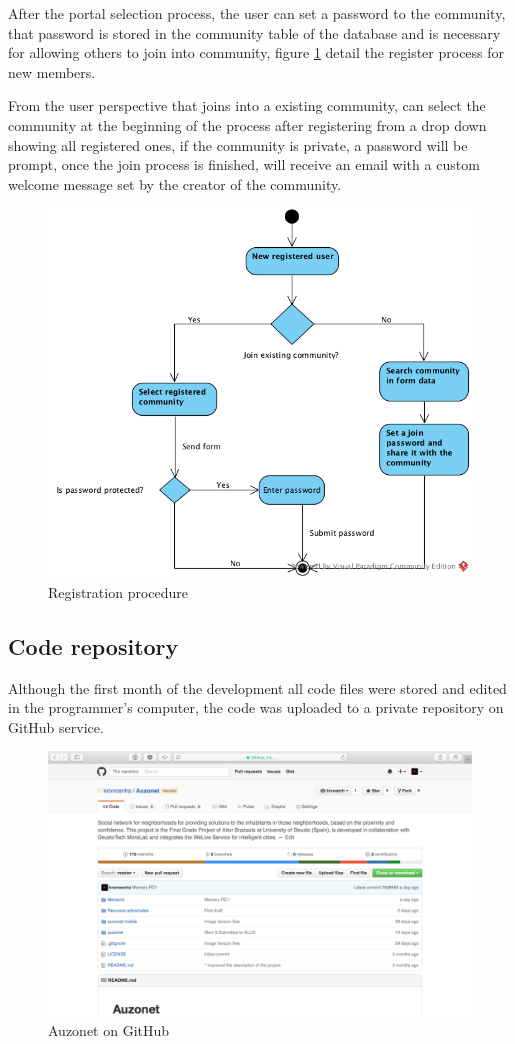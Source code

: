 \documentclass{DeustoFDP}
\begin{document}
After the portal selection process, the user can set a password to the community, that password is stored in the community table of the database and is necessary for allowing others to join into community, figure \ref{fig:Registerflow} detail the register process for new members.

From the user perspective that joins into a existing community, can select the community at the beginning of the process after registering from a drop down showing all registered ones, if the community is private, a password will be prompt, once the join process is finished, will receive an email with a custom welcome message set by the creator of the community.

\begin{figure}[h!]
\centering
\includegraphics[width=0.7\linewidth]{fig/Registerflow}
\caption[Registration procedure]{Registration procedure}
\label{fig:Registerflow}
\end{figure}

\newpage
\subsection{Code repository}
Although the first month of the development all code files were stored and edited in the programmer's computer, the code was uploaded to a private repository on GitHub service.

\begin{figure}[h!]
\centering
\includegraphics[width=0.7\linewidth]{fig/githubhome}
\caption[Auzonet on GitHub]{Auzonet on GitHub}
\label{fig:githubhome}
\end{figure}
\end{document}

